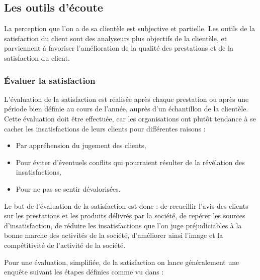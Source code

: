         \subsection[Les outils d’écoute]{Les outils d’écoute}
        La perception que l’on a de sa clientèle est subjective et partielle.
        Les outils de la satisfaction du client sont des analyseurs plus objectifs de la clientèle, 
        et parviennent à favoriser l’amélioration de la qualité des prestations et de la satisfaction du
        client.
            \subsubsection[Évaluer la satisfaction]{Évaluer la satisfaction}
            L’évaluation de la satisfaction est réalisée après chaque prestation ou après une période
            bien définie au cours de l’année, auprès d’un échantillon de la clientèle. Cette évaluation doit être effectuée, car les organisations ont plutôt
            tendance à se cacher les insatisfactions de leurs clients pour différentes raisons :
            \par    
                \begin{itemize}
                    \setlength{\itemsep}{0pt}
                    \item [\ding{226}] Par appréhension du jugement des clients,
                    \item [\ding{226}] Pour éviter d’éventuels conflits qui pourraient
                    résulter de la révélation des insatisfactions,
                    \item [\ding{226}] Pour ne pas se sentir dévalorisées.
                \end{itemize}
            Le but de l’évaluation de la satisfaction est donc : de recueillir l’avis des
            clients sur les prestations et les produits délivrés par la société,
            de repérer les sources d’insatisfaction, de réduire les insatisfactions que l’on juge
            préjudiciables à la bonne marche des activités de la société, d’améliorer ainsi
            l’image et la compétitivité de l’activité de la société. \cite*{Barouch2010}
            \par
            Pour une évaluation, simplifiée, de la satisfaction on lance généralement
            une enquête suivant les étapes définies comme vu dans
            \cite[Tab. \ref{table:etapeDeRealistaionEnqSatisfat}]{Barouch2010} :
